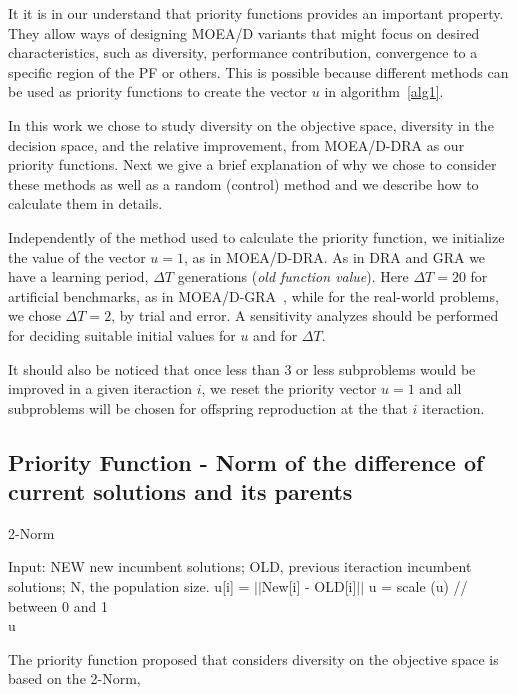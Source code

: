 It it is  in our understand that priority functions provides an important property. They allow ways of designing MOEA/D variants that might focus on desired characteristics, such as diversity, performance contribution, convergence to a specific region of the PF or others. This is possible because different methods can be used as priority functions to create the vector $u$ in algorithm~\ref{alg1}. 

In this work we chose to study diversity on the objective space, diversity in the decision space, and the relative improvement, from MOEA/D-DRA as our priority functions. Next we give a brief explanation of why we chose to consider these methods as well as a random (control) method and we describe how to calculate them in details.

Independently of the method used to calculate the priority function, we initialize the value of the vector $u=1$, as in MOEA/D-DRA. As in DRA and GRA we have a learning period, $\Delta T$ generations (\textit{old function value}). Here $\Delta T=20$ for artificial benchmarks, as in MOEA/D-GRA~\cite{zhou2016all}, while for the real-world problems, we chose $\Delta T=2$, by trial and error. A sensitivity analyzes should be performed for deciding suitable initial values for $u$ and for $\Delta T$.

 It should also be noticed that once less than $3$ or less subproblems would be improved in a given iteraction $i$, we reset the priority vector $u = 1$  and all subproblems will be chosen for offspring reproduction at the that $i$ iteraction.

\subsection{Priority Function - Norm of the difference of current solutions and its parents} 

\begin{algorithm}[t]
	\caption{2-Norm}\label{alg3}
	\begin{algorithmic}[1]
		
		\State Input: NEW new incumbent solutions; OLD, previous iteraction incumbent solutions; N, the population size.
			\State u[i] = $||$New[i] - OLD[i]$||$
		\EndFor
		\State u = scale (u) // between 0 and 1\\
	\Return u
	\end{algorithmic}
\end{algorithm}

The priority function proposed that considers diversity on the objective space is based on the 2-Norm,

